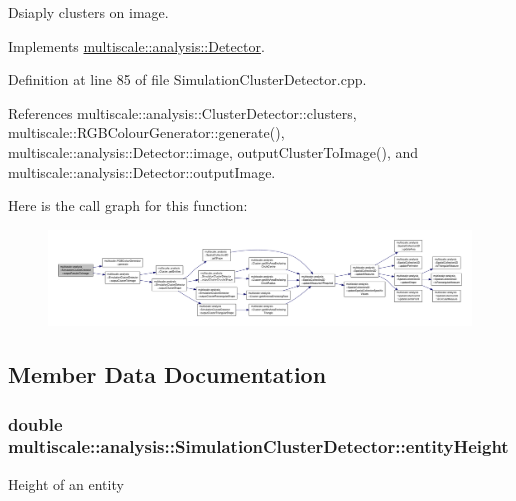Dsiaply clusters on image. 



Implements \hyperlink{classmultiscale_1_1analysis_1_1Detector_a5d10b68605d5a1711527b4b896b3b2cc}{multiscale\-::analysis\-::\-Detector}.



Definition at line 85 of file Simulation\-Cluster\-Detector.\-cpp.



References multiscale\-::analysis\-::\-Cluster\-Detector\-::clusters, multiscale\-::\-R\-G\-B\-Colour\-Generator\-::generate(), multiscale\-::analysis\-::\-Detector\-::image, output\-Cluster\-To\-Image(), and multiscale\-::analysis\-::\-Detector\-::output\-Image.



Here is the call graph for this function\-:\nopagebreak
\begin{figure}[H]
\begin{center}
\leavevmode
\includegraphics[width=350pt]{classmultiscale_1_1analysis_1_1SimulationClusterDetector_a909e1e53836f1688ebe312c5f7fb70b5_cgraph}
\end{center}
\end{figure}




\subsection{Member Data Documentation}
\hypertarget{classmultiscale_1_1analysis_1_1SimulationClusterDetector_a2ba5c2738d32f71ccaacba4129b7bcfc}{
\subsubsection[{entity\-Height}]{\setlength{\rightskip}{0pt plus 5cm}double multiscale\-::analysis\-::\-Simulation\-Cluster\-Detector\-::entity\-Height\hspace{0.3cm}{\ttfamily [private]}}}\label{classmultiscale_1_1analysis_1_1SimulationClusterDetector_a2ba5c2738d32f71ccaacba4129b7bcfc}
Height of an entity 

